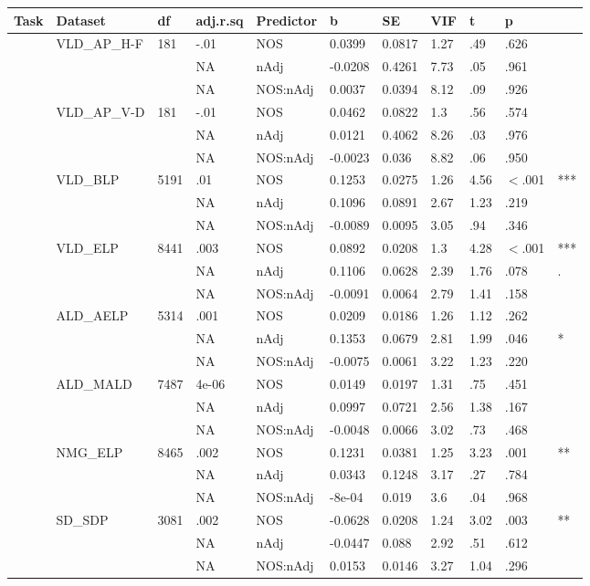 \begin{table}[ht]
\centering
\begingroup\normalsize
\begin{tabular}{lllllllllll}
  \hline
Task & Dataset & df & adj.r.sq & Predictor & b & SE & VIF & t & p &  \\ 
  \hline
 & VLD\_AP\_H-F & 181 & -.01 & NOS & 0.0399 & 0.0817 & 1.27 & .49 & .626 &   \\ 
   &  &  & NA & nAdj & -0.0208 & 0.4261 & 7.73 & .05 & .961 &   \\ 
   &  &  & NA & NOS:nAdj & 0.0037 & 0.0394 & 8.12 & .09 & .926 &   \\ 
   & VLD\_AP\_V-D & 181 & -.01 & NOS & 0.0462 & 0.0822 & 1.3 & .56 & .574 &   \\ 
   &  &  & NA & nAdj & 0.0121 & 0.4062 & 8.26 & .03 & .976 &   \\ 
   &  &  & NA & NOS:nAdj & -0.0023 & 0.036 & 8.82 & .06 & .950 &   \\ 
   & VLD\_BLP & 5191 & .01 & NOS & 0.1253 & 0.0275 & 1.26 & 4.56 & $<$.001 & *** \\ 
   &  &  & NA & nAdj & 0.1096 & 0.0891 & 2.67 & 1.23 & .219 &   \\ 
   &  &  & NA & NOS:nAdj & -0.0089 & 0.0095 & 3.05 & .94 & .346 &   \\ 
   & VLD\_ELP & 8441 & .003 & NOS & 0.0892 & 0.0208 & 1.3 & 4.28 & $<$.001 & *** \\ 
   &  &  & NA & nAdj & 0.1106 & 0.0628 & 2.39 & 1.76 & .078 & . \\ 
   &  &  & NA & NOS:nAdj & -0.0091 & 0.0064 & 2.79 & 1.41 & .158 &   \\ 
   & ALD\_AELP & 5314 & .001 & NOS & 0.0209 & 0.0186 & 1.26 & 1.12 & .262 &   \\ 
   &  &  & NA & nAdj & 0.1353 & 0.0679 & 2.81 & 1.99 & .046 & * \\ 
   &  &  & NA & NOS:nAdj & -0.0075 & 0.0061 & 3.22 & 1.23 & .220 &   \\ 
   & ALD\_MALD & 7487 & 4e-06 & NOS & 0.0149 & 0.0197 & 1.31 & .75 & .451 &   \\ 
   &  &  & NA & nAdj & 0.0997 & 0.0721 & 2.56 & 1.38 & .167 &   \\ 
   &  &  & NA & NOS:nAdj & -0.0048 & 0.0066 & 3.02 & .73 & .468 &   \\ 
   & NMG\_ELP & 8465 & .002 & NOS & 0.1231 & 0.0381 & 1.25 & 3.23 & .001 & ** \\ 
   &  &  & NA & nAdj & 0.0343 & 0.1248 & 3.17 & .27 & .784 &   \\ 
   &  &  & NA & NOS:nAdj & -8e-04 & 0.019 & 3.6 & .04 & .968 &   \\ 
   & SD\_SDP & 3081 & .002 & NOS & -0.0628 & 0.0208 & 1.24 & 3.02 & .003 & ** \\ 
   &  &  & NA & nAdj & -0.0447 & 0.088 & 2.92 & .51 & .612 &   \\ 
   &  &  & NA & NOS:nAdj & 0.0153 & 0.0146 & 3.27 & 1.04 & .296 &   \\ 
   \hline
\end{tabular}
\endgroup
\end{table}
